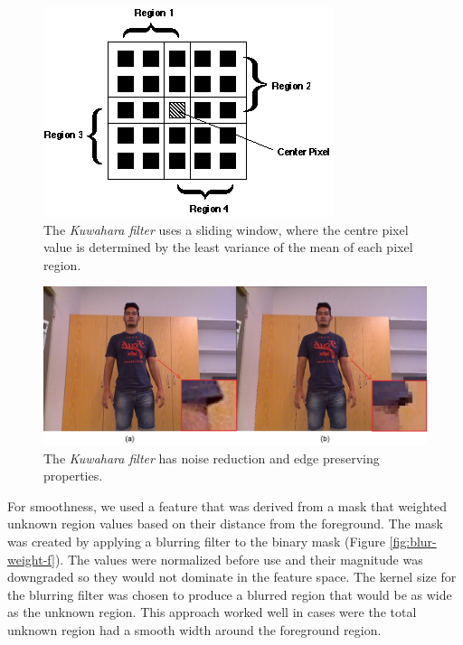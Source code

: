 \begin{figure}[t]
\centering
\includegraphics[width=0.6\columnwidth]{Chapter4/4/kuwa.png}
\caption[Kuwahara filter window illustration.]{The \textit{Kuwahara filter} uses a sliding window, where the centre pixel value is determined by the least variance of the mean of each pixel region.}
\label{fig:kuwahara-f}
\end{figure}

\begin{figure}[t]
\centering
\includegraphics[width=1\columnwidth]{Chapter4/4/Kuwahara_figure.jpg}
\caption[Kuwahara filter example.]{The \textit{Kuwahara filter} has noise reduction and edge preserving properties.}
\label{fig:kuwahara-f}
\end{figure}

For smoothness, we used a feature that was derived from a mask that weighted unknown region values based on their distance from the foreground. The mask was created by applying a blurring filter to the binary mask (Figure \ref{fig:blur-weight-f}). The values were normalized before use and their magnitude was downgraded so they would not dominate in the feature space. The kernel size for the blurring filter was chosen to produce a blurred region that would be as wide as the unknown region. This approach worked well in cases were the total unknown region had a smooth width around the foreground region.

